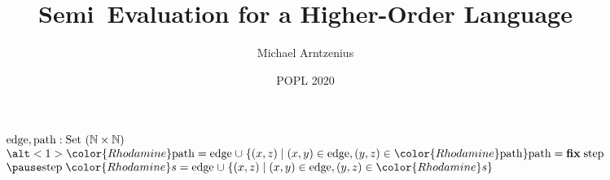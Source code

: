 \documentclass[fleqn,aspectratio=169,dvipsnames]{beamer}
\title{Semi\naive\ Evaluation for a Higher-Order Language}
\author{Michael Arntzenius}
\institute{University of Birmingham}
\date{POPL 2020}
\newcommand\N{\mathbb{N}}
\newcommand\x\times
\newcommand{\setfor}[2]{\{{#1} \mathrel{|} {#2}\}}
\newcommand\kw[1]{\ensuremath{\textbf{#1}}}
\newcommand\n\mathrm
\newcommand\tpname[1]{\text{#1}}
\newcommand\tset{\tpname{Set}~}
\newcommand\hi[1]{{\color{Rhodamine}#1}}
\begin{document}
  \LARGE

  \begin{frame}
    \[\begin{array}{l}
      \n{edge}, \n{path} : \tset (\N \x \N)
      \\
      \alt<1>{
        \hi{\n{path}} = \n{edge} \cup
        \setfor{(x,z)}{(x,y) \in \n{edge}, (y,z) \in \hi{\n{path}}}
      }{
        \n{path} = \kw{fix} \; \n{step}
      }
      \\\pause
      \n{step} \; \hi{s} = \n{edge} \cup
      \setfor{(x,z)}{(x,y) \in \n{edge}, (y,z) \in \hi{s}}
    \end{array}\]
  \end{frame}
\end{document}
